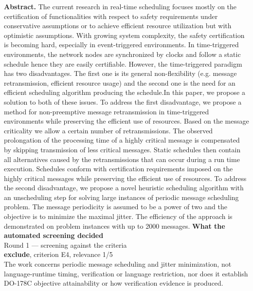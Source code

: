 \documentclass[11pt,a4paper]{article}
\begin{document}
{\small\textbf{Abstract.} The current research in real-time scheduling focuses mostly on the certification of functionalities with respect to safety requirements under conservative assumptions or to achieve efficient resource utilization but with optimistic assumptions. With growing system complexity, the safety certification is becoming hard, especially in event-triggered environments. In time-triggered environments, the network nodes are synchronized by clocks and follow a static schedule hence they are easily certifiable. However, the time-triggered paradigm has two disadvantages. The first one is its general non-flexibility (e.g. message retransmission, efficient resource usage) and the second one is the need for an efficient scheduling algorithm producing the schedule.In this paper, we propose a solution to both of these issues. To address the first disadvantage, we propose a method for non-preemptive message retransmission in time-triggered environments while preserving the efficient use of resources. Based on the message criticality we allow a certain number of retransmissions. The observed prolongation of the processing time of a highly critical message is compensated by skipping transmission of less critical messages. Static schedules then contain all alternatives caused by the retransmissions that can occur during a run time execution. Schedules conform with certification requirements imposed on the highly critical messages while preserving the efficient use of resources. To address the second disadvantage, we propose a novel heuristic scheduling algorithm with an unscheduling step for solving large instances of periodic message scheduling problem. The message periodicity is assumed to be a power of two and the objective is to minimize the maximal jitter. The efficiency of the approach is demonstrated on problem instances with up to 2000 messages.}
\vspace{3mm}
\vspace{2.5mm}
{\small\textbf{What the automated screening decided}}\\[2mm]
{\footnotesize\color{soft}Round 1 --- screening against the criteria}\\[0.5mm]
{\small\textbf{exclude}, criterion E4, relevance 1/5}\\[0.5mm]
{\small The work concerns periodic message scheduling and jitter minimization, not language-runtime timing, verification or language restriction, nor does it establish DO-178C objective attainability or how verification evidence is produced.}\\[2.5mm]
\end{document}
